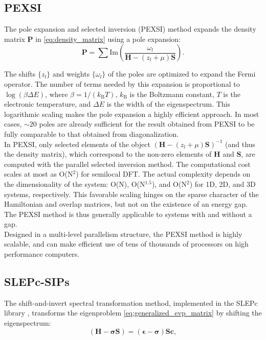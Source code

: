 \documentclass{report}
\begin{document}
\subsection{PEXSI}
\label{subsec:solvers_pexsi}
The pole expansion and selected inversion (PEXSI) method \cite{pexsi_lin_2009,pexsi_lin_2013} expands the density matrix $\boldsymbol{P}$ in \ref{eq:density_matrix} using a pole expansion:\\
\begin{equation}
\label{eq:pole}
\boldsymbol{P} = \sum \text{Im} \left( \frac{\omega_l}{\boldsymbol{H} - (z_l + \mu) \boldsymbol{S}} \right) .
\end{equation}

The shifts $\{z_{l}\}$ and weights $\{\omega_l\}$ of the poles are optimized to expand the Fermi operator.  The number of terms needed by this expansion is proportional to $\log(\beta\Delta E)$, where $\beta = 1/(k_\text{B} T)$, $k_\text{B}$ is the Boltzmann constant, $T$ is the electronic temperature, and $\Delta E$ is the width of the eigenspectrum.  This logarithmic scaling makes the pole expansion a highly efficient approach.  In most cases, $\sim 20$ poles are already sufficient for the result obtained from PEXSI to be fully comparable to that obtained from diagonalization.\\

In PEXSI, only selected elements of the object $(\boldsymbol{H} - (z_l + \mu) \boldsymbol{S})^{-1}$ (and thus the density matrix), which correspond to the non-zero elements of $\boldsymbol{H}$ and $\boldsymbol{S}$, are computed with the parallel selected inversion method.  The computational cost scales at most as O(N$^2$) for semilocal DFT.  The actual complexity depends on the dimensionality of the system:  O(N), O(N$^{1.5}$), and O(N$^2$) for 1D, 2D, and 3D systems, respectively.  This favorable scaling hinges on the sparse character of the Hamiltonian and overlap matrices, but not on the existence of an energy gap.  The PEXSI method is thus generally applicable to systems with and without a gap.\\

Designed in a multi-level parallelism structure, the PEXSI method is highly scalable, and can make efficient use of tens of thousands of processors on high performance computers.\\

\subsection{SLEPc-SIPs}
\label{subsec:solvers_sips}
The shift-and-invert spectral transformation method, implemented in the SLEPc library \cite{slepc_hernandez_2005}, transforms the eigenproblem \ref{eq:generalized_evp_matrix} by shifting the eigenspectrum:\\
\begin{equation}
\label{eq:shift}
(\boldsymbol{H} - \boldsymbol{\sigma} \boldsymbol{S}) = (\boldsymbol{\epsilon} - \boldsymbol{\sigma}) \boldsymbol{S} \boldsymbol{c} ,
\end{equation}
\end{document}
